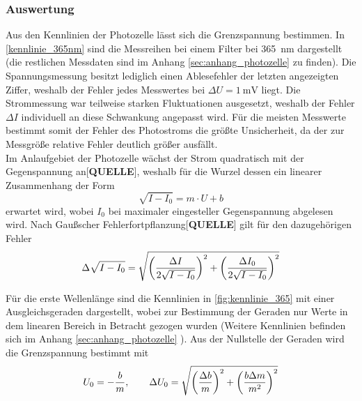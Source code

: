 \subsubsection{Auswertung}



Aus den Kennlinien der Photozelle lässt sich die Grenzspannung bestimmen. In \cref{kennlinie_365nm} sind die
Messreihen bei einem Filter bei \SI{365}{\nano\meter} dargestellt (die restlichen Messdaten sind im Anhang
\ref{sec:anhang_photozelle} zu finden). Die Spannungsmessung besitzt lediglich einen Ablesefehler der letzten
angezeigten Ziffer, weshalb der Fehler jedes Messwertes bei $\Delta U = \SI{1}{\milli\volt}$ liegt.
Die Strommessung war teilweise starken Fluktuationen ausgesetzt, weshalb der Fehler $\Delta I$
individuell an diese Schwankung angepasst wird. Für die meisten Messwerte bestimmt somit der Fehler
des Photostroms die größte Unsicherheit, da der zur Messgröße relative Fehler deutlich größer ausfällt.\\
Im Anlaufgebiet der Photozelle wächst der Strom quadratisch mit der Gegenspannung an[\textbf{QUELLE}],
weshalb für die Wurzel dessen ein linearer Zusammenhang der Form
\begin{equation}
	\sqrt{I - I_0} = m\cdot U + b \nonumber
\end{equation}
erwartet wird, wobei $I_0$ bei maximaler eingesteller Gegenspannung abgelesen wird.
Nach Gaußscher Fehlerfortpflanzung[\textbf{QUELLE}] gilt für den dazugehörigen Fehler
\begin{equation}
	\Delta\sqrt{I - I_0} = \sqrt{\qty(\frac{\Delta I}{2\sqrt{I-I_0}})^2 + \qty(\frac{\Delta I_0}{2\sqrt{I-I_0}})^2} \nonumber
\end{equation}

Für die erste Wellenlänge sind die Kennlinien in \cref{fig:kennlinie_365} mit einer Ausgleichsgeraden
dargestellt, wobei zur Bestimmung der Geraden nur Werte in dem linearen Bereich in Betracht gezogen wurden
(Weitere Kennlinien befinden sich im Anhang \ref{sec:anhang_photozelle}
). Aus der Nullstelle der Geraden wird die Grenzspannung
bestimmt mit
\begin{equation}
	U_0 = - \frac{b}{m},\qquad \Delta U_0 = \sqrt{\qty(\frac{\Delta b}{m})^2 + \qty(\frac{b\Delta m}{m^2})^2}
	\nonumber
	\label{eq:bestimmung_grenzspannung}
\end{equation}



